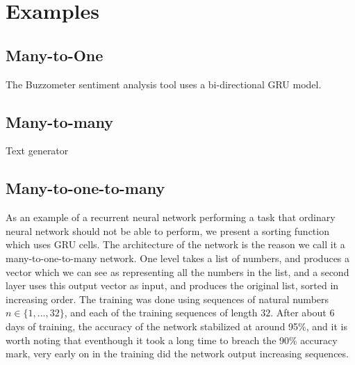 \documentclass[10pt]{amsart}
\begin{document}
\section{Examples}

\subsection{Many-to-One}

The Buzzometer sentiment analysis tool uses a bi-directional GRU model.


\subsection{Many-to-many}

Text generator


\subsection{Many-to-one-to-many}

As an example of a recurrent neural network performing a task that ordinary neural network
should not be able to perform, we present a sorting function which uses GRU cells. The architecture
of the network is the reason we call it a many-to-one-to-many network.  One level takes a list
of numbers, and produces a vector which we can see as representing all the numbers in the list,
and a second layer uses this output vector as input, and produces the original list, sorted in
increasing order. The training was done using sequences of natural numbers $n\in\{1,...,32\}$, and each
of the training sequences of length $32$.  After about 6 days of training, the accuracy of the network
stabilized at around 95\%, and it is worth noting that eventhough it took a long time to breach
the 90\% accuracy mark, very early on in the training did the network output increasing sequences.
\end{document}
